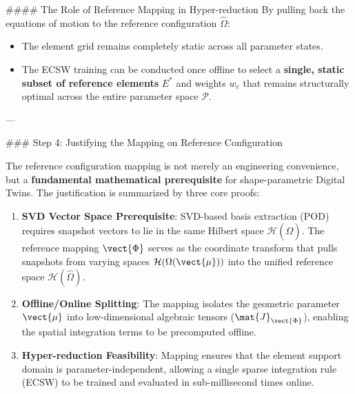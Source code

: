 #### The Role of Reference Mapping in Hyper-reduction
By pulling back the equations of motion to the reference configuration $\hat{\Omega}$:
\begin{itemize}
    \item The element grid remains completely static across all parameter states.
    \item The ECSW training can be conducted once offline to select a \textbf{single, static subset of reference elements} $E^*$ and weights $w_e$ that remains structurally optimal across the entire parameter space $\mathcal{P}$.
\end{itemize}

---

### Step 4: Justifying the Mapping on Reference Configuration

The reference configuration mapping is not merely an engineering convenience, but a \textbf{fundamental mathematical prerequisite} for shape-parametric Digital Twins. The justification is summarized by three core proofs:
\begin{enumerate}
    \item \textbf{SVD Vector Space Prerequisite}: SVD-based basis extraction (POD) requires snapshot vectors to lie in the same Hilbert space $\mathcal{H}(\hat{\Omega})$. The reference mapping $\vect{\Phi}$ serves as the coordinate transform that pulls snapshots from varying spaces $\mathcal{H}(\Omega(\vect{\mu}))$ into the unified reference space $\mathcal{H}(\hat{\Omega})$.
    \item \textbf{Offline/Online Splitting}: The mapping isolates the geometric parameter $\vect{\mu}$ into low-dimensional algebraic tensors ($\mat{J}_{\vect{\Phi}}$), enabling the spatial integration terms to be precomputed offline.
    \item \textbf{Hyper-reduction Feasibility}: Mapping ensures that the element support domain is parameter-independent, allowing a single sparse integration rule (ECSW) to be trained and evaluated in sub-millisecond times online.
\end{enumerate}
